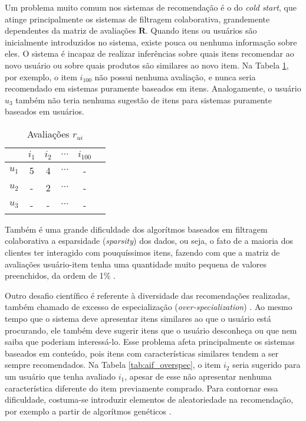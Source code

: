 Um problema muito comum nos sistemas de recomendação é o do \textit{cold start}, que atinge principalmente os sistemas de filtragem colaborativa, grandemente dependentes da matriz de avaliações $\mathbf{R}$. Quando itens ou usuários são inicialmente introduzidos no sistema, existe pouca ou nenhuma informação sobre eles. O sistema é incapaz de realizar inferências sobre quais itens recomendar ao novo usuário ou sobre quais produtos são similares ao novo item. Na Tabela \ref{tab:rui_cold_start}, por exemplo, o item $i_{100}$ não possui nenhuma avaliação, e nunca seria recomendado em sistemas puramente baseados em itens. Analogamente, o usuário $u_3$ também não teria nenhuma sugestão de itens para sistemas puramente baseados em usuários.

\begin{table}[h]
\begin{center}
    \caption{Avaliações $r_{ui}$}
    \label{tab:rui_cold_start}
    \begin{tabular}{ | c | c | c | c | c | c |} 
    \hline
     & $i_1$ & $i_2$ & $\cdots$ & $i_{100}$ \\ \hline
     $u_1$ & 5 & 4 & $\cdots$ & - \\ \hline
     $u_2$ & - & 2 & $\cdots$ & - \\ \hline
     $u_3$ & - & - & $\cdots$ & - \\ \hline
    \end{tabular}
\end{center}
\end{table}

Também é uma grande dificuldade dos algorítmos baseados em filtragem colaborativa a esparsidade (\textit{sparsity}) dos dados, ou seja, o fato de a maioria dos clientes ter interagido com  pouquíssimos itens, fazendo com que a matriz de avaliações usuário-item tenha uma quantidade muito pequena de valores preenchidos, da ordem de 1\% \cite{fennell2009collaborative}. 

Outro desafio científico é referente à diversidade das recomendações realizadas, também chamado de excesso de especialização (\textit{over-specialization}) \cite{adomavicius2005toward}. Ao mesmo tempo que o sistema deve apresentar itens similares ao que o usuário está procurando, ele também deve sugerir itens que o usuário desconheça ou que nem saiba que poderiam interessá-lo. Esse problema afeta principalmente os sistemas baseados em conteúdo, pois itens com características similares tendem a ser sempre recomendados. Na Tabela \ref{tab:aif_overspec}, o item $i_2$ seria sugerido para um usuário que tenha avaliado $i_1$, apesar de esse não apresentar nenhuma característica diferente do item previamente comprado. Para contornar essa dificuldade, costuma-se introduzir elementos de aleatoriedade na recomendação, por exemplo a partir de algorítmos genéticos \cite{balabanovic97fab}. 

